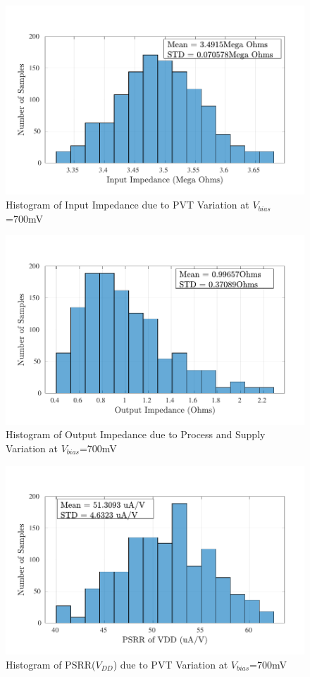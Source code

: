 \begin{figure} [H]
\centering
\includegraphics[scale=1]{Figures/Corners/Overall/PVT_Max/PDFs/PVT_Max_zin.pdf}
\caption{Histogram of Input Impedance due to PVT Variation at $V_{bias}$=700mV}
\end{figure}

\begin{figure} [H]
\centering
\includegraphics[scale=1]{Figures/Corners/Overall/PVT_Max/PDFs/PVT_Max_zout.pdf}
\caption{Histogram of Output Impedance due to Process and Supply Variation at $V_{bias}$=700mV}
\end{figure}

\begin{figure} [H]
\centering
\includegraphics[scale=1]{Figures/Corners/Overall/PVT_Max/PDFs/PVT_Max_psrrp.pdf}
\caption{Histogram of PSRR($V_{DD}$) due to PVT Variation at $V_{bias}$=700mV}
\end{figure}

